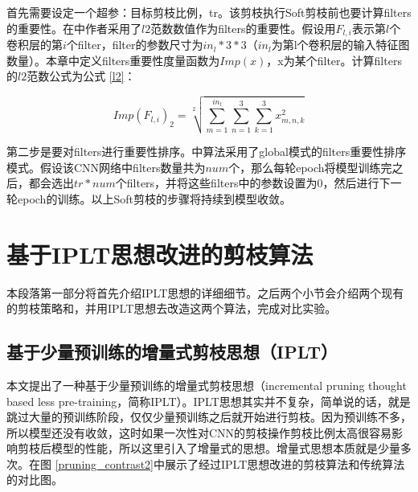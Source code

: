 \documentclass[ pdftex, oneside, master]{NJUthesis}
\begin{document}
\cite{27}首先需要设定一个超参：目标剪枝比例，tr。该剪枝执行Soft剪枝前也要计算filters的重要性。在\cite{27}中作者采用了$l2$范数数值作为filters的重要性。假设用$F_{l,i}$表示第$l$个卷积层的第$i$个filter，filter的参数尺寸为$in_l*3*3$（$in_l$为第l个卷积层的输入特征图数量）。本章中定义filters重要性度量函数为$Imp(x)$，x为某个filter。计算filters的$l2$范数公式为公式 \ref{l2}：

\begin{equation*}
Imp(F_{l,i})_2 =  \sqrt[2]{\sum_{m=1}^{in_l}\sum_{n=1}^3\sum_{k=1}^3 x_{m,n,k}^2}
\label{l2}
\end{equation*}

第二步是要对filters进行重要性排序。\cite{27}中算法采用了global模式的filters重要性排序模式。假设该CNN网络中filters数量共为$num$个，那么每轮epoch将模型训练完之后，\cite{27}都会选出$tr*num$个filters，并将这些filters中的参数设置为0，然后进行下一轮epoch的训练。以上Soft剪枝的步骤将持续到模型收敛。



\section{基于IPLT思想改进的剪枝算法}

本段落第一部分将首先介绍IPLT思想的详细细节。之后两个小节会介绍两个现有的剪枝策略\cite{17}和\cite{27}，并用IPLT思想去改造这两个算法，完成对比实验。

\subsection{基于少量预训练的增量式剪枝思想（IPLT）}

本文提出了一种基于少量预训练的增量式剪枝思想（incremental pruning thought based less pre-training，简称IPLT）。IPLT思想其实并不复杂，简单说的话，就是跳过大量的预训练阶段，仅仅少量预训练之后就开始进行剪枝。因为预训练不多，所以模型还没有收敛，这时如果一次性对CNN的剪枝操作剪枝比例太高很容易影响剪枝后模型的性能，所以这里引入了增量式的思想。增量式思想本质就是少量多次。在图 \ref{pruning_contrast2}中展示了经过IPLT思想改进的剪枝算法和传统算法的对比图。
\end{document}
